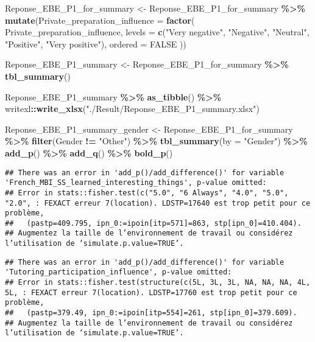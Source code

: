 \documentclass[
]{article}
\newenvironment{Shaded}{\begin{snugshade}}{\end{snugshade}}
\newcommand{\AttributeTok}[1]{\textcolor[rgb]{0.13,0.29,0.53}{#1}}
\newcommand{\ConstantTok}[1]{\textcolor[rgb]{0.56,0.35,0.01}{#1}}
\newcommand{\FunctionTok}[1]{\textcolor[rgb]{0.13,0.29,0.53}{\textbf{#1}}}
\newcommand{\NormalTok}[1]{#1}
\newcommand{\OtherTok}[1]{\textcolor[rgb]{0.56,0.35,0.01}{#1}}
\newcommand{\SpecialCharTok}[1]{\textcolor[rgb]{0.81,0.36,0.00}{\textbf{#1}}}
\newcommand{\StringTok}[1]{\textcolor[rgb]{0.31,0.60,0.02}{#1}}
\begin{document}
\begin{Shaded}
\begin{Highlighting}[]
\NormalTok{Reponse\_EBE\_P1\_for\_summary }\OtherTok{\textless{}{-}}\NormalTok{ Reponse\_EBE\_P1\_for\_summary }\SpecialCharTok{\%\textgreater{}\%}
  \FunctionTok{mutate}\NormalTok{(}\AttributeTok{Private\_preparation\_influence =} \FunctionTok{factor}\NormalTok{(}
\NormalTok{    Private\_preparation\_influence,}
    \AttributeTok{levels =} \FunctionTok{c}\NormalTok{(}\StringTok{"Very negative"}\NormalTok{, }\StringTok{"Negative"}\NormalTok{, }\StringTok{"Neutral"}\NormalTok{, }\StringTok{"Positive"}\NormalTok{, }\StringTok{"Very positive"}\NormalTok{),}
    \AttributeTok{ordered =} \ConstantTok{FALSE}
\NormalTok{  ))}


\NormalTok{Reponse\_EBE\_P1\_summary }\OtherTok{\textless{}{-}}
\NormalTok{  Reponse\_EBE\_P1\_for\_summary }\SpecialCharTok{\%\textgreater{}\%} \FunctionTok{tbl\_summary}\NormalTok{()}

\NormalTok{Reponse\_EBE\_P1\_summary }\SpecialCharTok{\%\textgreater{}\%} \FunctionTok{as\_tibble}\NormalTok{() }\SpecialCharTok{\%\textgreater{}\%}
\NormalTok{  writexl}\SpecialCharTok{::}\FunctionTok{write\_xlsx}\NormalTok{(}\StringTok{"./Result/Reponse\_EBE\_P1\_summary.xlsx"}\NormalTok{)}


\NormalTok{Reponse\_EBE\_P1\_summary\_gender }\OtherTok{\textless{}{-}}
\NormalTok{  Reponse\_EBE\_P1\_for\_summary }\SpecialCharTok{\%\textgreater{}\%} 
  \FunctionTok{filter}\NormalTok{(Gender }\SpecialCharTok{!=} \StringTok{"Other"}\NormalTok{) }\SpecialCharTok{\%\textgreater{}\%}
  \FunctionTok{tbl\_summary}\NormalTok{(}\AttributeTok{by =} \StringTok{"Gender"}\NormalTok{) }\SpecialCharTok{\%\textgreater{}\%}
  \FunctionTok{add\_p}\NormalTok{() }\SpecialCharTok{\%\textgreater{}\%} \FunctionTok{add\_q}\NormalTok{() }\SpecialCharTok{\%\textgreater{}\%} \FunctionTok{bold\_p}\NormalTok{()}
\end{Highlighting}
\end{Shaded}

\begin{verbatim}
## There was an error in 'add_p()/add_difference()' for variable 'French_MBI_SS_learned_interesting_things', p-value omitted:
## Error in stats::fisher.test(c("5.0", "6 Always", "4.0", "5.0", "2.0", : FEXACT erreur 7(location). LDSTP=17640 est trop petit pour ce problème,
##   (pastp=409.795, ipn_0:=ipoin[itp=571]=863, stp[ipn_0]=410.404).
## Augmentez la taille de l’environnement de travail ou considérez l’utilisation de ‘simulate.p.value=TRUE’.
\end{verbatim}

\begin{verbatim}
## There was an error in 'add_p()/add_difference()' for variable 'Tutoring_participation_influence', p-value omitted:
## Error in stats::fisher.test(structure(c(5L, 3L, 3L, NA, NA, NA, 4L, 5L, : FEXACT erreur 7(location). LDSTP=17760 est trop petit pour ce problème,
##   (pastp=379.49, ipn_0:=ipoin[itp=554]=261, stp[ipn_0]=379.609).
## Augmentez la taille de l’environnement de travail ou considérez l’utilisation de ‘simulate.p.value=TRUE’.
\end{verbatim}
\end{document}
